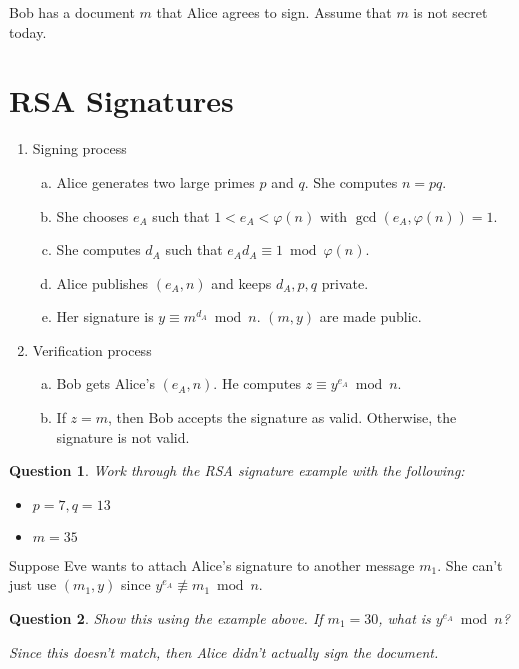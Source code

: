 \documentclass[12pt]{amsart}
\theoremstyle{plain}
\newtheorem{quest}{Question}
\theoremstyle{definition}
\theoremstyle{remark}
\begin{document}
\noindent Bob has a document $m$ that Alice agrees to sign.  Assume that $m$ is not secret today.

\newpage
\section{RSA Signatures}
\begin{framed}
\begin{enumerate}[1.]
	\item Signing process
		\begin{enumerate}[a.]
			\item Alice generates two large primes $p$ and $q$.  She computes $n = pq$.
			\item She chooses $e_A$ such that $1 < e_A < \varphi(n)$ with $\gcd(e_A, \varphi(n)) = 1$.
			\item She computes $d_A$ such that $e_Ad_A \equiv 1 \bmod \varphi(n)$.
			\item Alice publishes $(e_A, n)$ and keeps $d_A, p, q$ private.
			\item Her signature is $y \equiv m^{d_A} \bmod n$.  $(m, y)$ are made public.
		\end{enumerate}
	\item Verification process
	\begin{enumerate}[a.]
		\item Bob gets Alice's $(e_A, n)$.  He computes $z \equiv y^{e_A} \bmod n$.
		\item If $z = m$, then Bob accepts the signature as valid.  Otherwise, the signature is not valid.
	\end{enumerate}
\end{enumerate}
\end{framed}



\begin{quest}
Work through the RSA signature example with the following:
\begin{itemize}
	\item $p = 7, q = 13$
	\item $m = 35$
\end{itemize}
\end{quest}
\vspace{2in}

Suppose Eve wants to attach Alice's signature to another message $m_1$.  She can't just use $(m_1,y)$ since $y^{e_A} \not\equiv m_1 \bmod n$.

\begin{quest}
Show this using the example above.  If $m_1 = 30$, what is $y^{e_A} \bmod n$?\\ \vspace{1in}

Since this doesn't match, then Alice didn't actually sign the document.
\end{quest}
\end{document}
